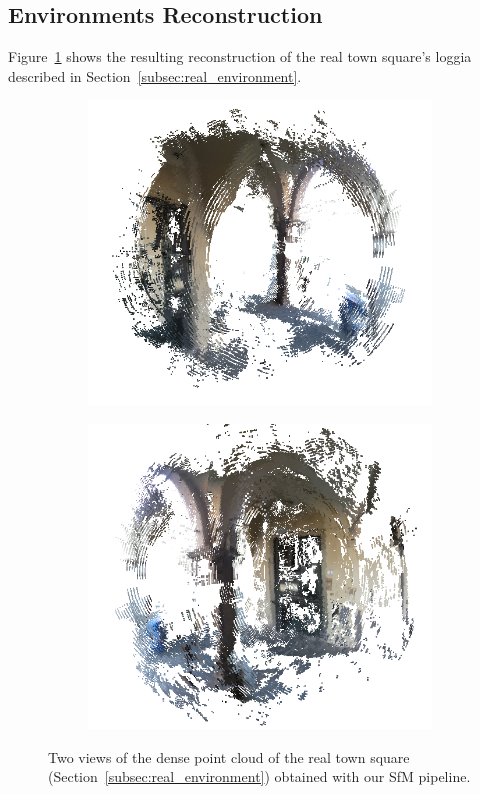 \subsection{Environments Reconstruction}
Figure~\ref{fig:real_reconstruction} shows the resulting reconstruction of the
real town square's loggia described in Section~\ref{subsec:real_environment}.
%
\begin{figure}[h]
\centering
	\begin{subfigure}{0.45\linewidth}
		\centering
		\includegraphics[width=\linewidth]{img/reconstruction1.png}
	\end{subfigure}
	\begin{subfigure}{0.45\linewidth}
		\centering
		\includegraphics[width=\linewidth]{img/reconstruction2.png}
	\end{subfigure}
	\caption{Two views of the dense point cloud of the real town square
	(Section~\ref{subsec:real_environment}) obtained with our SfM pipeline.}
	\label{fig:real_reconstruction}
\end{figure}

